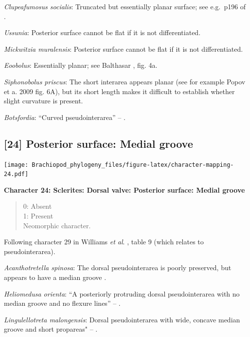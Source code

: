 \documentclass[openany]{book}
\theoremstyle{definition}
\theoremstyle{definition}
\theoremstyle{definition}
\theoremstyle{remark}
\begin{document}
\emph{Clupeafumosus socialis}: Truncated but essentially planar surface;
see e.g.~p196 of \citet{Topper2013Reappraisalof}.

\emph{Ussunia}: Posterior surface cannot be flat if it is not
differentiated.

\emph{Mickwitzia muralensis}: Posterior surface cannot be flat if it is
not differentiated.

\emph{Eoobolus}: Essentially planar; see Balthasar
\citeyearpar{Balthasar2009Thebrachiopod}, fig. 4a.

\emph{Siphonobolus priscus}: The short interarea appears planar (see for
example Popov et a. 2009 fig. 6A), but its short length makes it
difficult to establish whether slight curvature is present.

\emph{Botsfordia}: ``Curved pseudointerarea'' --
\citet{Skovsted2017Depthrelated}.

\hypertarget{posterior-surface-medial-groove}{%
\subsection*{{[}24{]} Posterior surface: Medial
groove}\label{posterior-surface-medial-groove}}

\texttt{[image: Brachiopod\_phylogeny\_files/figure-latex/character-mapping-24.pdf]}

\textbf{Character 24: Sclerites: Dorsal valve: Posterior surface: Medial
groove}

\begin{quote}
0: Absent\\
1: Present\\
Neomorphic character.
\end{quote}

Following character 29 in Williams \emph{et al}.
\citeyearpar{Williams2000BrachiopodaLinguliformea}, table 9 (which
relates to pseudointerarea).

\emph{Acanthotretella spinosa}: The dorsal pseudointerarea is poorly
preserved, but appears to have a median groove
\citep{Holmer2006Aspinose}.

\emph{Heliomedusa orienta}: ``A posteriorly protruding dorsal
pseudointerarea with no median groove and no flexure lines'' --
\citet{Chen2007Reinterpretationof}.

\emph{Lingulellotreta malongensis}: Dorsal pseudointerarea with wide,
concave median groove and short propareas" --
\citet{Williams2000BrachiopodaLinguliformea}.
\end{document}
